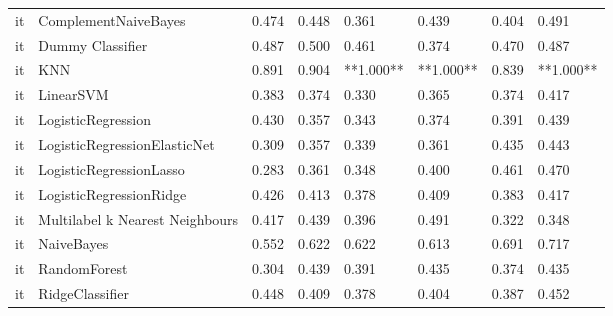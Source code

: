 \begin{tabular}{llllllll}
      it &            ComplementNaiveBayes & 0.474 &                     0.448 &                 0.361 &                  0.439 &                                   0.404 &     0.491 \\
      it &                Dummy Classifier & 0.487 &                     0.500 &                 0.461 &                  0.374 &                                   0.470 &     0.487 \\
      it &                             KNN & 0.891 &                     0.904 &             **1.000** &              **1.000** &                                   0.839 & **1.000** \\
      it &                       LinearSVM & 0.383 &                     0.374 &                 0.330 &                  0.365 &                                   0.374 &     0.417 \\
      it &              LogisticRegression & 0.430 &                     0.357 &                 0.343 &                  0.374 &                                   0.391 &     0.439 \\
      it &    LogisticRegressionElasticNet & 0.309 &                     0.357 &                 0.339 &                  0.361 &                                   0.435 &     0.443 \\
      it &         LogisticRegressionLasso & 0.283 &                     0.361 &                 0.348 &                  0.400 &                                   0.461 &     0.470 \\
      it &         LogisticRegressionRidge & 0.426 &                     0.413 &                 0.378 &                  0.409 &                                   0.383 &     0.417 \\
      it & Multilabel k Nearest Neighbours & 0.417 &                     0.439 &                 0.396 &                  0.491 &                                   0.322 &     0.348 \\
      it &                      NaiveBayes & 0.552 &                     0.622 &                 0.622 &                  0.613 &                                   0.691 &     0.717 \\
      it &                    RandomForest & 0.304 &                     0.439 &                 0.391 &                  0.435 &                                   0.374 &     0.435 \\
      it &                 RidgeClassifier & 0.448 &                     0.409 &                 0.378 &                  0.404 &                                   0.387 &     0.452 \\

\end{tabular}
